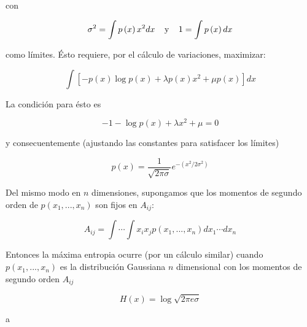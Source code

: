con

\begin{equation}
\sigma^{2}=\int p\left ( x \right )x^{2}dx \:\:\:\:\: \textup{y} \:\:\:\:\: 1=\int p\left ( x \right )dx
\end{equation}

como l\'{i}mites. \'{E}sto requiere, por el c\'{a}lculo de variaciones, maximizar:

\begin{equation}
\int \left [ -p\left ( x \right ) \log p\left ( x \right ) + \lambda p\left ( x \right ) x^{2} + \mu p\left ( x \right )\right ]dx
\end{equation}

La condici\'{o}n para \'{e}sto es

\begin{equation}
-1-\log p\left ( x \right )+\lambda x^{2}+\mu =0
\end{equation}

y consecuentemente (ajustando las constantes para satisfacer los l\'{i}mites)

\begin{equation}
p\left ( x \right )=\frac{1}{\sqrt{2\pi \sigma }}e^{-\left ( x^{2}/2\sigma ^{2} \right )}
\end{equation}

Del mismo modo en $n$ dimensiones, supongamos que los momentos de segundo orden de $p\left ( x_{1},...,x_{n} \right )$ son fijos en $A_{ij}$:

\begin{equation}
A_{ij}=\int \cdots \int x_{i}x_{j}p\left ( x_{1},...,x_{n} \right )dx_{1}\cdots dx_{n}
\end{equation}

Entonces la m\'{a}xima entropia ocurre (por un c\'{a}lculo similar) cuando $p\left ( x_{1},...,x_{n} \right )$ es la distribuci\'{o}n Gaussiana $n$ dimensional con los momentos de segundo orden $A_{ij}$

\begin{equation}
H\left ( x \right )=\log \sqrt{2\pi e\sigma }
\end{equation}

a\\

